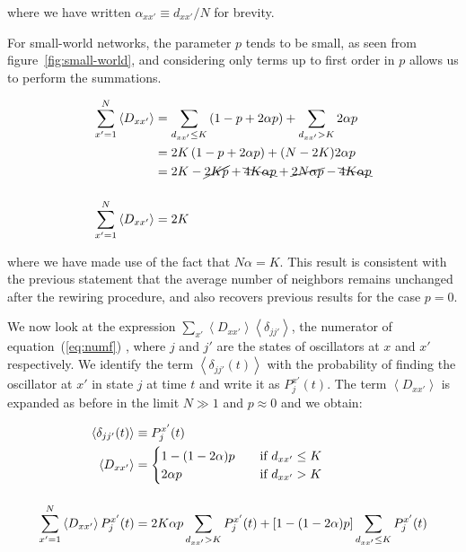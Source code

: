 \noindent where we have written $\alpha_{xx'} \equiv d_{xx'}/N$ for brevity.

For small-world networks, the parameter $p$ tends to be small\cite{rodrigues2020synchronization}, as seen from
figure~\ref{fig:small-world}, and considering only terms up to first order in $p$ allows us to perform the summations.

\begin{align}
    \sum_{x'=1}^N \left< D_{xx'} \right> &= \sum_{d_{xx'}\leq K} \left( 1 - p + 2\alpha p \right) + \sum_{d_{xx'}> K} 2\alpha p \notag\\
    &= 2K\left( 1 - p + 2\alpha p \right) + (N-2K)2\alpha p \notag\\
    &= 2K - \cancel{2Kp} + \bcancel{4K\alpha p} + \cancel{2N\alpha p} - \bcancel{4K\alpha p} \notag\\[12pt]
    \sum_{x'=1}^N \left< D_{xx'} \right> &= 2K
    \label{eq:ppower3}
\end{align}

\noindent where we have made use of the fact that $N\alpha = K$. This result is consistent with the previous statement that the average
number of neighbors remains unchanged after the rewiring procedure, and also recovers previous results\cite{escaff2014arrays} for the
case $p=0$.

We now look at the expression $\sum_{x'} \left< D_{xx'} \right> \left< \delta_{jj'} \right>$, the numerator of equation~(\ref{eq:numf})
, where $j$ and $j'$ are the states of oscillators at $x$ and $x'$ respectively. We identify the term $\left< \delta_{jj'}(t) \right>$
with the probability of finding the oscillator at $x'$ in state $j$ at time $t$ and write it as $P^{x'}_j(t)$. The term $\left< D_{xx'}
\right>$ is expanded as before in the limit $N \gg 1$ and $p \approx 0$ and we obtain:

\begin{align}
    \left< \delta_{jj'}(t) \right> &\equiv P_j^{x'}(t) \notag\\
    \left< D_{xx'} \right> &=
    \begin{cases}
        1-(1-2\alpha)p \quad &\text{if $d_{xx'} \leq K$}\\
        2\alpha p \quad &\text{if $d_{xx'} > K$}\\
    \end{cases} \notag\\[12pt]
    \sum_{x'=1}^N \left< D_{xx'} \right> P_j^{x'}(t) &= 2K\alpha p \sum_{d_{xx'}>K}P_j^{x'}(t) + [1-(1-2\alpha)p]\sum_{d_{xx'}\leq K} P_j^{x'}(t)
    \label{eq:numerator}
\end{align}

